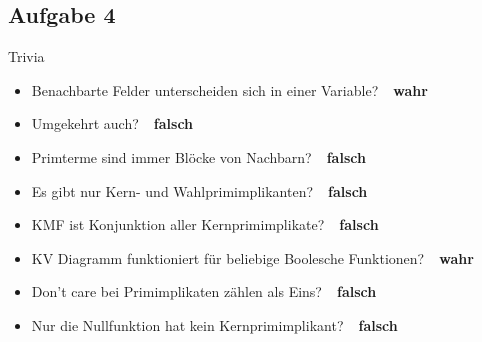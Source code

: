 \documentclass[aspectratio=169,usepdftitle=true,11pt,ngerman,t]{beamer}
\begin{document}
\subsection{Aufgabe 4}
\begin{frame}{Trivia}\onslide<+->
    \begin{solve}
    \begin{itemize}[<+->]
        \item Benachbarte Felder unterscheiden sich in einer Variable?~\onslide<+->\textbf{\faAngleRight~wahr}
        \item Umgekehrt auch?~\onslide<+->\textbf{\faAngleRight~falsch}
        \item Primterme sind immer Blöcke von Nachbarn?~\onslide<+->\textbf{\faAngleRight~falsch}
        \item Es gibt nur Kern- und Wahlprimimplikanten?~\onslide<+->\textbf{\faAngleRight~falsch}
        \item KMF ist Konjunktion aller Kernprimimplikate?~\onslide<+->\textbf{\faAngleRight~falsch}
        \item KV Diagramm funktioniert für beliebige Boolesche Funktionen?~\onslide<+->\textbf{\faAngleRight~wahr}
        \item Don't care bei Primimplikaten zählen als Eins?~\onslide<+->\textbf{\faAngleRight~falsch}
        \item Nur die Nullfunktion hat kein Kernprimimplikant?~\onslide<+->\textbf{\faAngleRight~falsch}
    \end{itemize}
    \end{solve}
\end{frame}
\end{document}
